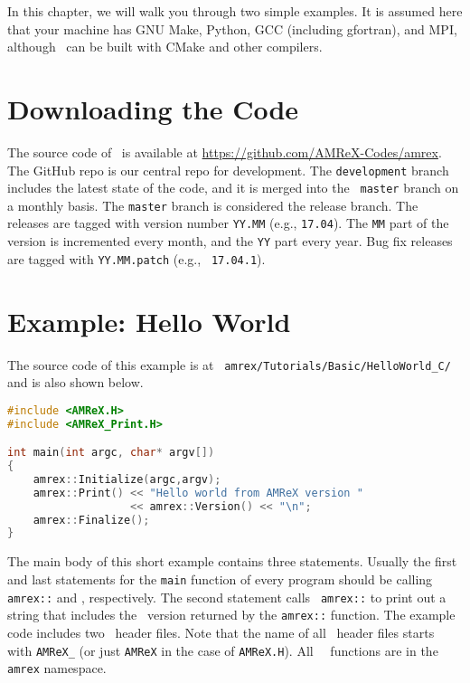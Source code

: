 In this chapter, we will walk you through two simple examples.  It is
assumed here that your machine has GNU Make, Python, GCC (including
gfortran), and MPI, although \amrex\ can be built with CMake and other
compilers. 

\section{Downloading the Code}

The source code of \amrex\ is available at
\url{https://github.com/AMReX-Codes/amrex}.  The GitHub repo is our
central repo for development.  The {\tt development} branch
includes the latest state of the code, and it is merged into the {\tt
  master} branch on a monthly basis.  The {\tt master} branch is
considered the release branch.  The releases are tagged with version
number {\tt YY.MM} (e.g., {\tt 17.04}).  The {\tt MM} part of the
version is incremented every month, and the {\tt YY} part every year.
Bug fix releases are tagged with {\tt YY.MM.patch} (e.g., {\tt
  17.04.1}).

\section{Example: Hello World}

The source code of this example is at {\tt
  amrex/Tutorials/Basic/HelloWorld\_C/} and is also shown below. 

\begin{lstlisting}[language=cpp]
#include <AMReX.H>
#include <AMReX_Print.H>

int main(int argc, char* argv[])
{
    amrex::Initialize(argc,argv);
    amrex::Print() << "Hello world from AMReX version " 
                   << amrex::Version() << "\n";
    amrex::Finalize();
}
\end{lstlisting}

The main body of this short example contains three statements.
Usually the first and last statements for the {\tt main} function of
every program should be calling {\tt amrex::} and
, respectively.  The second statement calls {\tt
  amrex::} to print out a string that includes the
\amrex\ version returned by the {\tt amrex::}
function.  The example code includes two \amrex\ header files.  Note
that the name of all \amrex\ header files starts with {\tt AMReX\_}
(or just {\tt AMReX} in the case of {\tt AMReX.H}).  All \amrex\
\cpp\ functions are in the {\tt amrex} namespace.  

